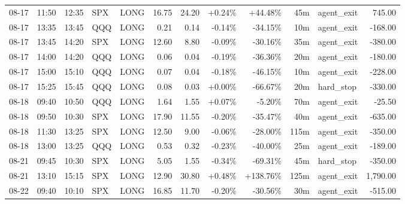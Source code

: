 \documentclass[11pt,a4paper,twoside]{article}
\begin{document}
\begin{center}
\begin{longtable}{>{\color{txtmain}}l l l l l r r r r r >{\color{txtmain}}l r}
08-17 & 11:50 & 12:35 & SPX & LONG & 16.75 & 24.20 & \textcolor{wingreen}{+0.24\%} & \textcolor{wingreen}{+44.48\%} & 45m & agent\_exit & \textcolor{wingreen}{745.00} \\
08-17 & 13:35 & 13:45 & QQQ & LONG & 0.21 & 0.14 & \textcolor{lossred}{-0.14\%} & \textcolor{lossred}{-34.15\%} & 10m & agent\_exit & \textcolor{lossred}{-168.00} \\
08-17 & 13:45 & 14:20 & SPX & LONG & 12.60 & 8.80 & \textcolor{lossred}{-0.09\%} & \textcolor{lossred}{-30.16\%} & 35m & agent\_exit & \textcolor{lossred}{-380.00} \\
08-17 & 14:00 & 14:20 & QQQ & LONG & 0.06 & 0.04 & \textcolor{lossred}{-0.19\%} & \textcolor{lossred}{-36.36\%} & 20m & agent\_exit & \textcolor{lossred}{-180.00} \\
08-17 & 15:00 & 15:10 & QQQ & LONG & 0.07 & 0.04 & \textcolor{lossred}{-0.18\%} & \textcolor{lossred}{-46.15\%} & 10m & agent\_exit & \textcolor{lossred}{-228.00} \\
08-17 & 15:25 & 15:45 & QQQ & LONG & 0.08 & 0.03 & \textcolor{wingreen}{+0.00\%} & \textcolor{lossred}{-66.67\%} & 20m & hard\_stop & \textcolor{lossred}{-330.00} \\
08-18 & 09:40 & 10:50 & QQQ & LONG & 1.64 & 1.55 & \textcolor{wingreen}{+0.07\%} & \textcolor{lossred}{-5.20\%} & 70m & agent\_exit & \textcolor{lossred}{-25.50} \\
08-18 & 09:50 & 10:30 & SPX & LONG & 17.90 & 11.55 & \textcolor{lossred}{-0.20\%} & \textcolor{lossred}{-35.47\%} & 40m & agent\_exit & \textcolor{lossred}{-635.00} \\
08-18 & 11:30 & 13:25 & SPX & LONG & 12.50 & 9.00 & \textcolor{lossred}{-0.06\%} & \textcolor{lossred}{-28.00\%} & 115m & agent\_exit & \textcolor{lossred}{-350.00} \\
08-18 & 13:00 & 13:25 & QQQ & LONG & 0.53 & 0.32 & \textcolor{lossred}{-0.23\%} & \textcolor{lossred}{-40.00\%} & 25m & agent\_exit & \textcolor{lossred}{-189.00} \\
08-21 & 09:45 & 10:30 & SPX & LONG & 5.05 & 1.55 & \textcolor{lossred}{-0.34\%} & \textcolor{lossred}{-69.31\%} & 45m & hard\_stop & \textcolor{lossred}{-350.00} \\
08-21 & 13:10 & 15:15 & SPX & LONG & 12.90 & 30.80 & \textcolor{wingreen}{+0.48\%} & \textcolor{wingreen}{+138.76\%} & 125m & agent\_exit & \textcolor{wingreen}{1,790.00} \\
08-22 & 09:40 & 10:10 & SPX & LONG & 16.85 & 11.70 & \textcolor{lossred}{-0.20\%} & \textcolor{lossred}{-30.56\%} & 30m & agent\_exit & \textcolor{lossred}{-515.00} \\

\end{longtable}
\end{center}
\end{document}
